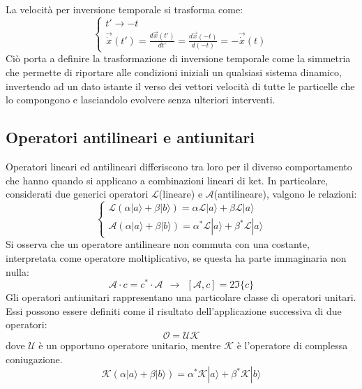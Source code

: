 La velocità per inversione temporale si trasforma come:
\begin{displaymath}
\left\{
\begin{array}{l}
 t' \rightarrow -t\\
 \vec{\dot{x}}(t') = \frac{d\vec{x}(t')}{dt'} = \frac{d\vec{x}(-t)}{d(-t)} = - \vec{\dot{x}}(t) 
\end{array}
\right.
\end{displaymath}
Ciò porta a definire la trasformazione di inversione temporale come la simmetria che permette di riportare alle condizioni iniziali un qualsiasi sistema dinamico, invertendo ad un dato istante il verso dei vettori velocit\`a di tutte le particelle che lo compongono e lasciandolo evolvere senza ulteriori interventi.
%
\subsection{Operatori antilineari e antiunitari}
\noindent
Operatori lineari ed antilineari differiscono tra loro per il diverso comportamento che hanno quando si applicano a combinazioni lineari di ket.
In particolare, considerati due generici operatori $\mathscr{L}$(lineare) e $\mathscr{A}$(antilineare), valgono le relazioni:
\begin{displaymath}
\left\{
\begin{array}{l}
\mathscr{L}(\alpha |a \rangle + \beta |b \rangle) = \alpha \mathscr{L}|a \rangle  + \beta \mathscr{L}|a \rangle\\
\mathscr{A}(\alpha |a \rangle + \beta |b \rangle) = \alpha^*\mathscr{L}|a \rangle  + \beta^* \mathscr{L}|a \rangle
\end{array}
\right.
\end{displaymath}
Si osserva che un operatore antilineare non commuta con una costante, interpretata come operatore moltiplicativo, se questa ha parte immaginaria non nulla:
\begin{equation}
\mathscr{A} \cdot c = c^* \cdot \mathscr{A} \ \  \longrightarrow \
\ [\mathscr{A},c] = 2 \Im\{c\}
\end{equation}
Gli operatori antiunitari rappresentano una particolare classe di operatori unitari. 
Essi possono essere definiti come il risultato dell'applicazione successiva di due operatori:
\begin{equation}
\mathscr{O} = \mathscr{U}\mathscr{K}
\end {equation}
dove $\mathscr{U}$ è un opportuno operatore unitario, mentre $\mathscr{K}$ è l'operatore di complessa coniugazione.
\begin{equation}
\mathscr{K} (\alpha |a\rangle + \beta |b\rangle) =
\alpha^*\mathscr{K}  |a\rangle + \beta^* \mathscr{K}|b\rangle
\end {equation}
